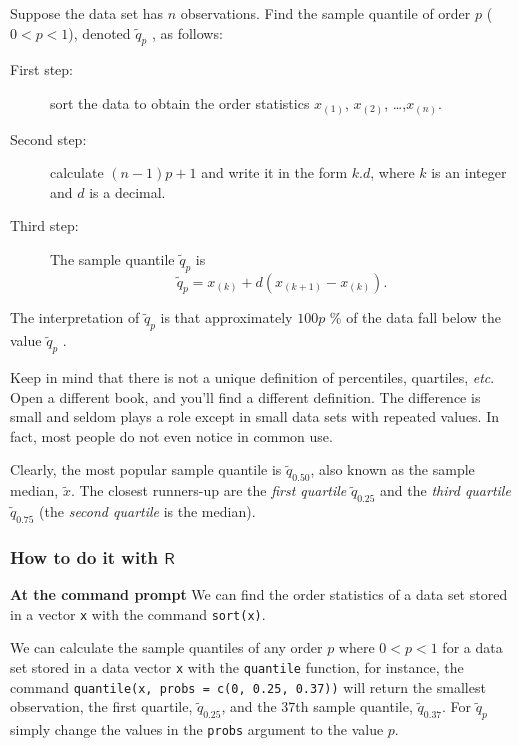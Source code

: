 \documentclass[10pt,english]{scrbook}
\begin{document}
Suppose the data set has \(n\) observations. Find the sample quantile of order \(p\) (\(0<p<1\)), denoted \(\tilde{q}_{p}\) , as follows: 

\begin{description}
\item[First step:] sort the data to obtain the order statistics \(x_{(1)}\), \(x_{(2)}\), \ldots{},\(x_{(n)}\).
\item[Second step:] calculate \((n-1)p+1\) and write it in the form \(k.d\), where \(k\) is an integer and \(d\) is a decimal.
\item[Third step:] The sample quantile \(\tilde{q}_{p}\) is
\begin{equation}
   \tilde{q}_{p}=x_{(k)}+d(x_{(k+1)}-x_{(k)}).
\end{equation}
\end{description}

The interpretation of \(\tilde{q}_{p}\) is that approximately \(100p\) \% of the data fall below the value \(\tilde{q}_{p}\) . 

Keep in mind that there is not a unique definition of percentiles, quartiles, \emph{etc}. Open a different book, and you'll find a different definition. The difference is small and seldom plays a role except in small data sets with repeated values. In fact, most people do not even notice in common use.

Clearly, the most popular sample quantile is \(\tilde{q}_{0.50}\), also known as the sample median, \(\tilde{x}\). The closest runners-up are the \emph{first quartile} \(\tilde{q}_{0.25}\) and the \emph{third quartile} \(\tilde{q}_{0.75}\) (the \emph{second quartile} is the median). 

\subsubsection[How to do it with \(\mathsf{R}\)]{How to do it with \(\mathsf{R}\)}
\label{sec-1-3-3-1}

\textbf{At the command prompt}
We can find the order statistics of a data set stored in a vector \texttt{x} with the command \texttt{sort(x)}.

We can calculate the sample quantiles of any order \(p\) where \(0<p<1\) for a data set stored in a data vector \texttt{x} with the \texttt{quantile} function, for instance, the command \texttt{quantile(x, probs = c(0, 0.25, 0.37))} will return the smallest observation, the first quartile, \(\tilde{q}_{0.25}\), and the 37th sample quantile, \(\tilde{q}_{0.37}\). For \(\tilde{q}_{p}\) simply change the values in the \texttt{probs} argument to the value \(p\).
\end{document}
